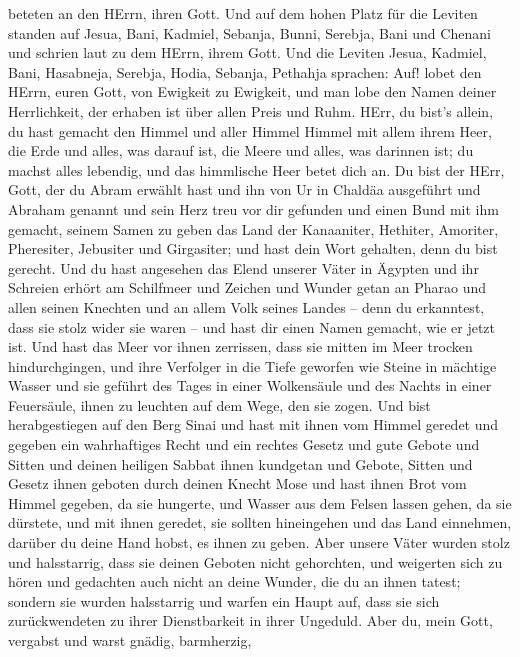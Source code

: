 beteten an den HErrn, ihren Gott.  Und auf dem hohen Platz
für die Leviten standen auf Jesua, Bani, Kadmiel, Sebanja, Bunni,
Serebja, Bani und Chenani und schrien laut zu dem HErrn, ihrem Gott.
 Und die Leviten Jesua, Kadmiel, Bani, Hasabneja, Serebja,
Hodia, Sebanja, Pethahja sprachen: Auf! lobet den HErrn, euren Gott, von
Ewigkeit zu Ewigkeit, und man lobe den Namen deiner Herrlichkeit, der
erhaben ist über allen Preis und Ruhm.  HErr, du bist's
allein, du hast gemacht den Himmel und aller Himmel Himmel mit allem
ihrem Heer, die Erde und alles, was darauf ist, die Meere und alles, was
darinnen ist; du machst alles lebendig, und das himmlische Heer betet
dich an.  Du bist der HErr, Gott, der du Abram erwählt hast
und ihn von Ur in Chaldäa ausgeführt und Abraham genannt 
und sein Herz treu vor dir gefunden und einen Bund mit ihm gemacht,
seinem Samen zu geben das Land der Kanaaniter, Hethiter, Amoriter,
Pheresiter, Jebusiter und Girgasiter; und hast dein Wort gehalten, denn
du bist gerecht.  Und du hast angesehen das Elend unserer
Väter in Ägypten und ihr Schreien erhört am Schilfmeer  und
Zeichen und Wunder getan an Pharao und allen seinen Knechten und an
allem Volk seines Landes -- denn du erkanntest, dass sie stolz wider sie
waren -- und hast dir einen Namen gemacht, wie er jetzt ist.
 Und hast das Meer vor ihnen zerrissen, dass sie mitten im
Meer trocken hindurchgingen, und ihre Verfolger in die Tiefe geworfen
wie Steine in mächtige Wasser  und sie geführt des Tages in
einer Wolkensäule und des Nachts in einer Feuersäule, ihnen zu leuchten
auf dem Wege, den sie zogen.  Und bist herabgestiegen auf
den Berg Sinai und hast mit ihnen vom Himmel geredet und gegeben ein
wahrhaftiges Recht und ein rechtes Gesetz und gute Gebote und Sitten
 und deinen heiligen Sabbat ihnen kundgetan und Gebote,
Sitten und Gesetz ihnen geboten durch deinen Knecht Mose 
und hast ihnen Brot vom Himmel gegeben, da sie hungerte, und Wasser aus
dem Felsen lassen gehen, da sie dürstete, und mit ihnen geredet, sie
sollten hineingehen und das Land einnehmen, darüber du deine Hand hobst,
es ihnen zu geben.  Aber unsere Väter wurden stolz und
halsstarrig, dass sie deinen Geboten nicht gehorchten,  und
weigerten sich zu hören und gedachten auch nicht an deine Wunder, die du
an ihnen tatest; sondern sie wurden halsstarrig und warfen ein Haupt
auf, dass sie sich zurückwendeten zu ihrer Dienstbarkeit in ihrer
Ungeduld. Aber du, mein Gott, vergabst und warst gnädig, barmherzig,

